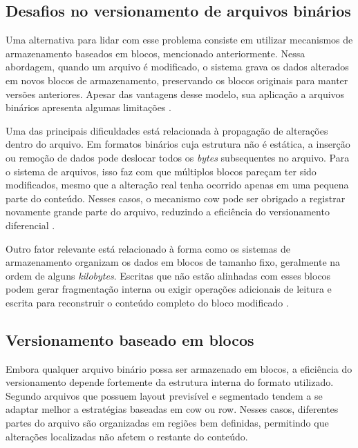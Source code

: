 \subsection{Desafios no versionamento de arquivos binários}
\label{sec:desafios-binarios}

Uma alternativa para lidar com esse problema consiste em utilizar mecanismos de armazenamento baseados em blocos, mencionado anteriormente. Nessa abordagem, quando um arquivo é modificado, o sistema grava os dados alterados em novos blocos de armazenamento, preservando os blocos originais para manter versões anteriores. Apesar das vantagens desse modelo, sua aplicação a arquivos binários apresenta algumas limitações \cite{Kasampalis2010}.

Uma das principais dificuldades está relacionada à propagação de alterações dentro do arquivo. Em formatos binários cuja estrutura não é estática, a inserção ou remoção de dados pode deslocar todos os \textit{bytes} subsequentes no arquivo. Para o sistema de arquivos, isso faz com que múltiplos blocos pareçam ter sido modificados, mesmo que a alteração real tenha ocorrido apenas em uma pequena parte do conteúdo. Nesses casos, o mecanismo \gls{cow} pode ser obrigado a registrar novamente grande parte do arquivo, reduzindo a eficiência do versionamento diferencial \cite{Kasampalis2010}.

Outro fator relevante está relacionado à forma como os sistemas de armazenamento organizam os dados em blocos de tamanho fixo, geralmente na ordem de alguns \textit{kilobytes}. Escritas que não estão alinhadas com esses blocos podem gerar fragmentação interna ou exigir operações adicionais de leitura e escrita para reconstruir o conteúdo completo do bloco modificado  \cite{Kasampalis2010}.

\subsection{Versionamento baseado em blocos}

Embora qualquer arquivo binário possa ser armazenado em blocos, a eficiência do versionamento depende fortemente da estrutura interna do formato utilizado. Segundo  arquivos que possuem layout previsível e segmentado tendem a se adaptar melhor a estratégias baseadas em \gls{cow} ou \gls{row}. Nesses casos, diferentes partes do arquivo são organizadas em regiões bem definidas, permitindo que alterações localizadas não afetem o restante do conteúdo.

